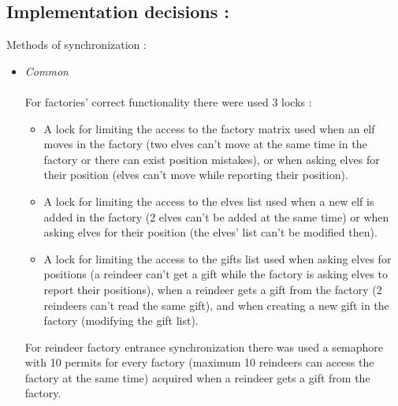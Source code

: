 \documentclass{article}
\begin{document}
 \subsection{\textbf{Implementation decisions :}}
    \large{Methods of synchronization :}
    \\
    \begin{itemize}
        \item \textit{Common}
        \\
        \\
        For factories' correct functionality there were used 3 locks : 
            \begin{itemize}
                \item A lock for limiting the access to the factory matrix used when an elf moves in the factory (two elves can't move at the same time in the factory or there can exist position mistakes), or when asking elves for their position (elves can't move while reporting their position).
                \item A lock for limiting the access to the elves list used when a new elf is added in the factory (2 elves can't be added at the same time) or when asking elves for their position (the elves' list can't be modified then).
                \item A lock for limiting the access to the gifts list used when asking elves for positions (a reindeer can't get a gift while the factory is asking elves to report their
                positions), when a reindeer gets a gift from the factory (2 reindeers can't read the same gift), and when creating a new gift in the factory (modifying the gift list).
            \end{itemize}
        
        For reindeer factory entrance synchronization there was used a semaphore with 10 permits for every factory (maximum 10 reindeers can access the factory at the same time) acquired when a reindeer gets a gift from the factory.
        \\
        

\end{itemize}
\end{document}
